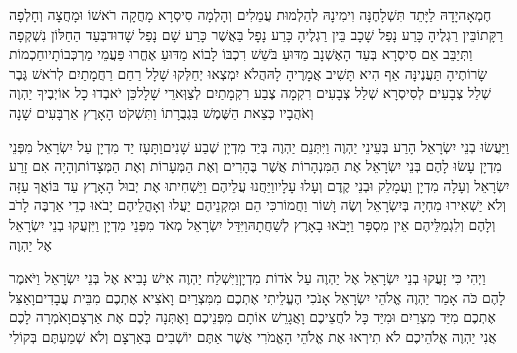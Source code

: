 \documentclass[../main/main.tex]{subfiles}
\begin{document}
\begin{multicols*}{\ncols}
חֶמְאָה\PreVerseSpace{}יָדָהּ לַיָּתֵד תִּשְׁלָחֶנָּה\SubEnd{} וִימִינָהּ לְהַלְמוּת עֲמֵלִים וְהָלְמָה סִיסְרָא מָחֲקָה רֹאשׁוֹ וּמָחֲצָה וְחָלְפָה רַקָּתוֹ\PreVerseSpace{}בֵּין רַגְלֶיהָ כָּרַע נָפַל שָׁכָב בֵּין רַגְלֶיהָ כָּרַע נָפָל בַּאֲשֶׁר כָּרַע שָׁם נָפַל שָׁדוּד\PreVerseSpace{}בְּעַד הַחַלּוֹן נִשְׁקְפָה וַתְּיַבֵּב אֵם סִיסְרָא בְּעַד הָאֶשְׁנָב מַדּוּעַ בֹּשֵׁשׁ רִכְבּוֹ לָבוֹא מַדּוּעַ אֶחֱרוּ פַּעֲמֵי מַרְכְּבוֹתָיו\PreVerseSpace{}חַכְמוֹת שָׂרוֹתֶיהָ תַּעֲנֶינָּה אַף הִיא תָּשִׁיב אֲמָרֶיהָ לָהּ\PreVerseSpace{}הֲלֹא יִמְצְאוּ יְחַלְּקוּ שָׁלָל רַחַם רַחֲמָתַיִם לְרֹאשׁ גֶּבֶר שְׁלַל צְבָעִים לְסִיסְרָא שְׁלַל צְבָעִים רִקְמָה צֶבַע רִקְמָתַיִם לְצַוְּארֵי שָׁלָל\PreVerseSpace{}כֵּן יֹאבְדוּ כָל אוֹיְבֶיךָ יַהְוֶה וְאֹהֲבָיו כְּצֵאת הַשֶּׁמֶשׁ בִּגְבֻרָתוֹ וַתִּשְׁקֹט הָאָרֶץ אַרְבָּעִים שָׁנָה\OpenSection{}\par
{}וַיַּעֲשׂוּ בְנֵי יִשְׂרָאֵל הָרַע בְּעֵינֵי יַהְוֶה וַיִּתְּנֵם יַהְוֶה בְּיַד מִדְיָן שֶׁבַע שָׁנִים\PreVerseSpace{}וַתָּעָז יַד מִדְיָן עַל יִשְׂרָאֵל מִפְּנֵי מִדְיָן עָשׂוּ לָהֶם בְּנֵי יִשְׂרָאֵל אֶת הַמִּנְהָרוֹת אֲשֶׁר בֶּהָרִים וְאֶת הַמְּעָרוֹת וְאֶת הַמְּצָדוֹת\PreVerseSpace{}וְהָיָה אִם זָרַע יִשְׂרָאֵל וְעָלָה מִדְיָן וַעֲמָלֵק וּבְנֵי קֶדֶם וְעָלוּ עָלָיו\PreVerseSpace{}וַיַּחֲנוּ עֲלֵיהֶם וַיַּשְׁחִיתוּ אֶת יְבוּל הָאָרֶץ עַד בּוֹאֲךָ עַזָּה וְלֹא יַשְׁאִירוּ מִחְיָה בְּיִשְׂרָאֵל וְשֶׂה וָשׁוֹר וַחֲמוֹר\PreVerseSpace{}כִּי הֵם וּמִקְנֵיהֶם יַעֲלוּ וְאָהֳלֵיהֶם יָבֹאוּ כְדֵי אַרְבֶּה לָרֹב וְלָהֶם וְלִגְמַלֵּיהֶם אֵין מִסְפָּר וַיָּבֹאוּ בָאָרֶץ לְשַׁחֲתָהּ\PreVerseSpace{}וַיִּדַּל יִשְׂרָאֵל מְאֹד מִפְּנֵי מִדְיָן וַיִּזְעֲקוּ בְנֵי יִשְׂרָאֵל אֶל יַהְוֶה\OpenSection{}\par
{}וַיְהִי כִּי זָעֲקוּ בְנֵי יִשְׂרָאֵל אֶל יַהְוֶה עַל אֹדוֹת מִדְיָן\PreVerseSpace{}וַיִּשְׁלַח יַהְוֶה אִישׁ נָבִיא אֶל בְּנֵי יִשְׂרָאֵל וַיֹּאמֶר לָהֶם כֹּה אָמַר יַהְוֶה אֱלֹהֵי יִשְׂרָאֵל אָנֹכִי הֶעֱלֵיתִי אֶתְכֶם מִמִּצְרַיִם וָאֹצִיא אֶתְכֶם מִבֵּית עֲבָדִים\PreVerseSpace{}וָאַצִּל אֶתְכֶם מִיַּד מִצְרַיִם וּמִיַּד כָּל לֹחֲצֵיכֶם וָאֲגָרֵשׁ אוֹתָם מִפְּנֵיכֶם וָאֶתְּנָה לָכֶם אֶת אַרְצָם\PreVerseSpace{}וָאֹמְרָה לָכֶם אֲנִי יַהְוֶה אֱלֹהֵיכֶם לֹא תִירְאוּ אֶת אֱלֹהֵי הָאֱמֹרִי אֲשֶׁר אַתֶּם יוֹשְׁבִים בְּאַרְצָם וְלֹא שְׁמַעְתֶּם בְּקוֹלִי\OpenSection{}\par

\end{multicols*}
\end{document}
